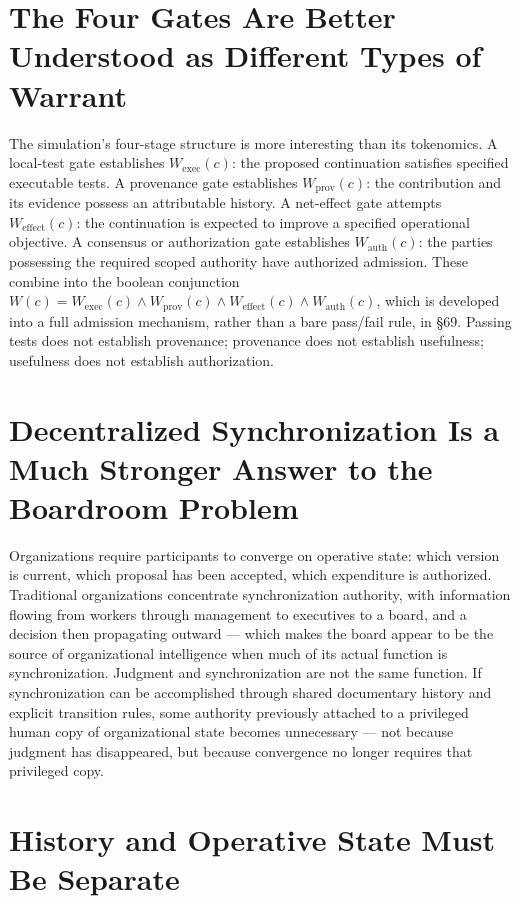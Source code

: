 \documentclass[12pt]{article}
\begin{document}
\section{The Four Gates Are Better Understood as Different Types of Warrant}

The simulation's four-stage structure is more interesting than its tokenomics. A local-test gate establishes $W_{\mathrm{exec}}(c)$: the proposed continuation satisfies specified executable tests. A provenance gate establishes $W_{\mathrm{prov}}(c)$: the contribution and its evidence possess an attributable history. A net-effect gate attempts $W_{\mathrm{effect}}(c)$: the continuation is expected to improve a specified operational objective. A consensus or authorization gate establishes $W_{\mathrm{auth}}(c)$: the parties possessing the required scoped authority have authorized admission. These combine into the boolean conjunction $W(c)=W_{\mathrm{exec}}(c)\land W_{\mathrm{prov}}(c)\land W_{\mathrm{effect}}(c)\land W_{\mathrm{auth}}(c)$, which is developed into a full admission mechanism, rather than a bare pass/fail rule, in \S69. Passing tests does not establish provenance; provenance does not establish usefulness; usefulness does not establish authorization.

\section{Decentralized Synchronization Is a Much Stronger Answer to the Boardroom Problem}

Organizations require participants to converge on operative state: which version is current, which proposal has been accepted, which expenditure is authorized. Traditional organizations concentrate synchronization authority, with information flowing from workers through management to executives to a board, and a decision then propagating outward — which makes the board appear to be the source of organizational intelligence when much of its actual function is synchronization. Judgment and synchronization are not the same function. If synchronization can be accomplished through shared documentary history and explicit transition rules, some authority previously attached to a privileged human copy of organizational state becomes unnecessary — not because judgment has disappeared, but because convergence no longer requires that privileged copy.

\section{History and Operative State Must Be Separate}
\end{document}
